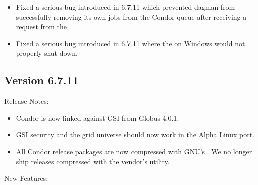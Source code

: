 \begin{itemize}

\item Fixed a serious bug introduced in 6.7.11 which prevented \Condor 
{dagman} from successfully removing its own jobs from the Condor  
queue after receiving a  request from the .

\item Fixed a serious bug introduced in 6.7.11 where the  
on Windows would not properly shut down.

\end{itemize}


\subsection*{\label{sec:New-6-7.11}Version 6.7.11}

\noindent Release Notes:

\begin{itemize}

\item Condor is now linked against GSI from Globus 4.0.1.

\item GSI security and the grid universe should now work in the Alpha 
Linux port.

\item All Condor release packages are now compressed with GNU's
  .
  We no longer ship releases compressed with the vendor's
   utility.

\end{itemize}


\noindent New Features:


